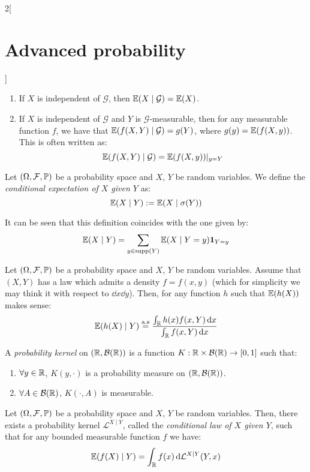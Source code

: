 \documentclass[../../../main_math.tex]{subfiles}
\begin{document}
\begin{multicols}{2}[\section{Advanced probability}]
\begin{proposition}
\begin{enumerate}
      \item If $X$ is independent of $\mathcal{G}$, then $\mathbb{E}(X\mid \mathcal{G})=\mathbb{E}(X)$.
      \item If $X$ is independent of $\mathcal{G}$ and $Y$ is $\mathcal{G}$-measurable, then for any measurable function $f$, we have that $\mathbb{E}(f(X,Y)\mid \mathcal{G})=g(Y)$, where $g(y)=\mathbb{E}(f(X,y))$. This is often written as:
            $$
              \mathbb{E}(f(X,Y)\mid \mathcal{G})=\mathbb{E}(f(X,y))|_{y=Y}
            $$
    \end{enumerate}
  \end{proposition}
  \begin{definition}
    Let $(\Omega,\mathcal{F},\mathbb{P})$ be a probability space and $X$, $Y$ be random variables. We define the \emph{conditional expectation of $X$ given $Y$} as:
    $$
      \mathbb{E}(X\mid Y):=\mathbb{E}(X\mid \sigma(Y))
    $$
  \end{definition}
  \begin{remark}
    It can be seen that this definition coincides with the one given by:
    $$
      \mathbb{E}(X\mid Y)=\sum_{y\in \operatorname{supp}(Y)} \mathbb{E}(X\mid Y=y)\boldsymbol{\mathrm{1}}_{Y=y}
    $$
  \end{remark}
  \begin{proposition}
    Let $(\Omega,\mathcal{F},\mathbb{P})$ be a probability space and $X$, $Y$ be random variables. Assume that $(X,Y)$ has a law which admits a density $f=f(x,y)$ (which for simplicity we may think it with respect to $\dd{x}\dd{y}$). Then, for any function $h$ such that $\mathbb{E}(h(X))$ makes sense:
    $$
      \mathbb{E}(h(X)\mid Y)\overset{\text{a.s}}{=}\frac{\int_{\mathbb{R}}{h(x)f(x,Y)\dd{x}}}{\int_{\mathbb{R}}{f(x,Y)\dd{x}}}
    $$
  \end{proposition}
  \begin{definition}
    A \emph{probability kernel} on $(\mathbb{R}, \mathcal{B}(\mathbb{R}))$ is a function $K:\mathbb{R}\times \mathcal{B}(\mathbb{R})\to [0,1]$ such that:
    \begin{enumerate}
      \item $\forall y\in \mathbb{R}$, $K(y,\cdot)$ is a probability measure on $(\mathbb{R},\mathcal{B}(\mathbb{R}))$.
      \item $\forall A\in \mathcal{B}(\mathbb{R})$, $K(\cdot,A)$ is measurable.
    \end{enumerate}
  \end{definition}
  \begin{theorem}
    Let $(\Omega,\mathcal{F},\mathbb{P})$ be a probability space and $X$, $Y$ be random variables. Then, there exists a probability kernel $\mathcal{L}^{X\mid Y}$, called the \emph{conditional law of $X$ given $Y$}, such that for any bounded measurable function $f$ we have:
    $$
      \mathbb{E}(f(X)\mid Y)=\int_{\mathbb{R}}{f(x)\dd{\mathcal{L}^{X\mid Y}(Y,x)}}
    $$
  \end{theorem}

\end{multicols}
\end{document}
